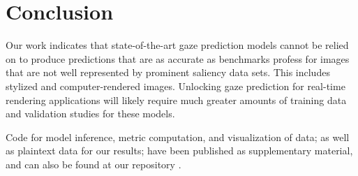 \documentclass[sigconf]{acmart}
\begin{document}
\section{Conclusion}
Our work indicates that state-of-the-art gaze prediction models cannot be relied on to produce
predictions that are as accurate as benchmarks profess for images that are not well represented
by prominent saliency data sets. This includes stylized and computer-rendered images. Unlocking
gaze prediction for real-time rendering applications will likely require much greater amounts of
training data and validation studies for these models.

Code for model inference, metric computation, and visualization of data; as well as plaintext data
for our results; have been published as supplementary material, and can also be found at our
repository \cite{our-code}.



\end{document}
